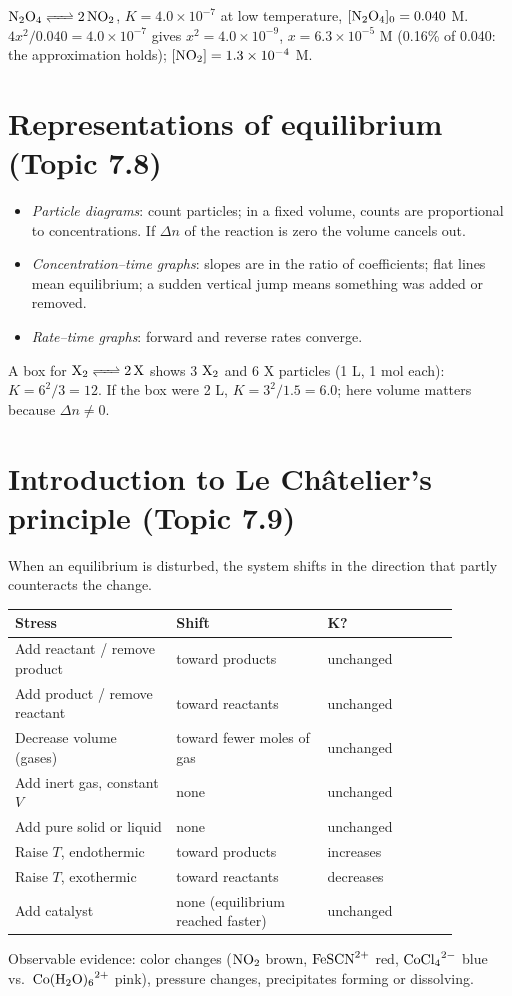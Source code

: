 \documentclass[11pt]{article}
\begin{document}
 $\ce{N2O4 <=> 2NO2}$, $K = 4.0\times10^{-7}$ at low temperature, $[\ce{N2O4}]_0 = 0.040$ M. $4x^2/0.040 = 4.0\times10^{-7}$ gives $x^2 = 4.0\times10^{-9}$, $x = 6.3\times10^{-5}$ M (0.16\% of 0.040: the approximation holds); $[\ce{NO2}] = 1.3\times10^{-4}$ M.

\section{Representations of equilibrium (Topic 7.8)}\label{t:7.8}
\begin{itemize}
\item \emph{Particle diagrams}: count particles; in a fixed volume, counts are proportional to concentrations. If $\Delta n$ of the reaction is zero the volume cancels out.
\item \emph{Concentration--time graphs}: slopes are in the ratio of coefficients; flat lines mean equilibrium; a sudden vertical jump means something was added or removed.
\item \emph{Rate--time graphs}: forward and reverse rates converge.
\end{itemize}
 A box for $\ce{X2 <=> 2X}$ shows 3 $\ce{X2}$ and 6 X particles (1 L, 1 mol each): $K = 6^2/3 = 12$. If the box were 2 L, $K = 3^2/1.5 = 6.0$; here volume matters because $\Delta n \ne 0$.

\section{Introduction to Le Châtelier's principle (Topic 7.9)}\label{t:7.9}
When an equilibrium is disturbed, the system shifts in the direction that partly counteracts the change.
\begin{center}
\begin{tabular}{p{0.32\linewidth}p{0.3\linewidth}p{0.26\linewidth}}\toprule
Stress & Shift & K? \\ \midrule
Add reactant / remove product & toward products & unchanged \\
Add product / remove reactant & toward reactants & unchanged \\
Decrease volume (gases) & toward fewer moles of gas & unchanged \\
Add inert gas, constant $V$ & none & unchanged \\
Add pure solid or liquid & none & unchanged \\
Raise $T$, endothermic & toward products & increases \\
Raise $T$, exothermic & toward reactants & decreases \\
Add catalyst & none (equilibrium reached faster) & unchanged \\ \bottomrule
\end{tabular}
\end{center}
Observable evidence: color changes ($\ce{NO2}$ brown, $\ce{FeSCN^2+}$ red, $\ce{CoCl4^2-}$ blue vs.\ $\ce{Co(H2O)6^2+}$ pink), pressure changes, precipitates forming or dissolving.
\end{document}
